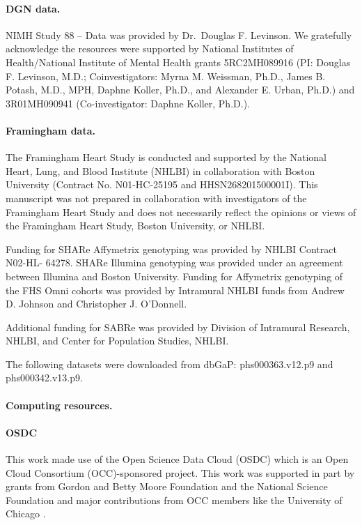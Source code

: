 \documentclass[10pt,letterpaper]{article}
\begin{document}
\paragraph{DGN data.}\label{dgn-data}

NIMH Study 88 -- Data was provided by
Dr.~Douglas F. Levinson. We gratefully acknowledge the resources were
supported by National Institutes of Health/National Institute of Mental
Health grants 5RC2MH089916 (PI: Douglas F. Levinson, M.D.;
Coinvestigators: Myrna M. Weissman, Ph.D., James B. Potash, M.D., MPH,
Daphne Koller, Ph.D., and Alexander E. Urban, Ph.D.) and 3R01MH090941
(Co-investigator: Daphne Koller, Ph.D.).

\paragraph{Framingham data.}

The Framingham Heart Study is conducted and supported by the National Heart, Lung, and Blood Institute (NHLBI) in collaboration with Boston University (Contract No. N01-HC-25195 and HHSN268201500001I). This manuscript was not prepared in collaboration with investigators of the Framingham Heart Study and does not necessarily reflect the opinions or views of the Framingham Heart Study, Boston University, or NHLBI.

Funding for SHARe Affymetrix genotyping was provided by NHLBI Contract N02-HL- 64278. SHARe Illumina genotyping was provided under an agreement between Illumina and Boston University. Funding for Affymetrix genotyping of the FHS Omni cohorts was provided by Intramural NHLBI funds from Andrew D. Johnson and Christopher J. O'Donnell.

Additional funding for SABRe was provided by Division of Intramural Research, NHLBI, and Center for Population Studies, NHLBI.

The following datasets were downloaded from dbGaP: phs000363.v12.p9 and phs000342.v13.p9.

\paragraph{Computing resources.}\label{computing-resources}

\paragraph{OSDC}

This work made use of the Open Science Data Cloud (OSDC) which is an
Open Cloud Consortium (OCC)-sponsored project. This work was supported
in part by grants from Gordon and Betty Moore Foundation and the
National Science Foundation and major contributions from OCC members
like the University of Chicago \cite{grossman2012design}.
\end{document}
